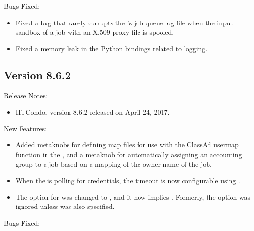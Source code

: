 \noindent Bugs Fixed:

\begin{itemize}

\item Fixed a bug that rarely corrupts the 's job queue
log file when the input sandbox of a job with an X.509 proxy file is
spooled.

\item Fixed a memory leak in the Python bindings related to logging.

\end{itemize}

\subsection*{\label{sec:New-8-6-2}Version 8.6.2}

\noindent Release Notes:

\begin{itemize}

\item HTCondor version 8.6.2 released on April 24, 2017.

\end{itemize}


\noindent New Features:

\begin{itemize}

\item Added metaknobs for defining map files for use with the ClassAd usermap function
in the , and a metaknob for automatically assigning an accounting group to
a job based on a mapping of the owner name of the job.

\item When the  is polling for credentials, the timeout is now
configurable using .

\item The  option for  was changed to ,
and it now implies . Formerly, the  option was ignored
unless  was also specified.

\end{itemize}

\noindent Bugs Fixed:

